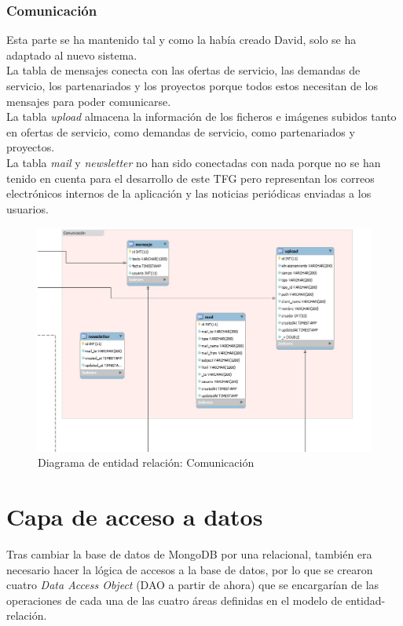 \documentclass[11pt]{article}
\begin{document}
\subsubsection{Comunicación}
Esta parte se ha mantenido tal y como la había creado David, solo se ha adaptado al nuevo sistema.\\
La tabla de mensajes conecta con las ofertas de servicio, las demandas de servicio, los partenariados y los proyectos porque todos estos necesitan de los mensajes para poder comunicarse.\\
La tabla \textit{upload} almacena la información de los ficheros e imágenes subidos tanto en ofertas de servicio, como demandas de servicio, como partenariados y proyectos.\\
La tabla \textit{mail} y \textit{newsletter} no han sido conectadas con nada porque no se han tenido en cuenta para el desarrollo de este TFG pero representan los correos electrónicos internos de la aplicación y las noticias periódicas enviadas a los usuarios.
\begin{figure}
	\centering
	\includegraphics[scale=0.4]{comunicacion}
	\caption{Diagrama de entidad relación: Comunicación}
\end{figure}

\section{Capa de acceso a datos}

Tras cambiar la base de datos de MongoDB por una relacional, también era necesario hacer la lógica de accesos a la base de datos, por lo que se crearon cuatro \emph{Data Access Object} (DAO a partir de ahora) que se encargarían de las operaciones de cada una de las cuatro áreas definidas en el modelo de entidad-relación.
\end{document}
